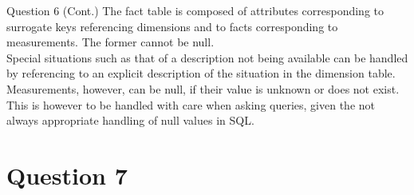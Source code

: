 \begin{frame}[fragile]{Question 6 (Cont.)}
	The fact table is composed of attributes corresponding to surrogate keys referencing dimensions and to facts corresponding to measurements. The former cannot be null. \\\vspace{5pt}
	Special situations such as that of a description not being available can be handled by referencing to an explicit description of the situation in the dimension table. \\\vspace{5pt} 
	Measurements, however, can be null, if their value is unknown or does not exist. This is however to be handled with care when asking queries, given the not always appropriate handling of null values in SQL.
\end{frame}
\section*{Question 7}

